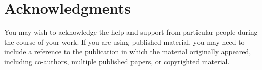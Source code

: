\chapter*{Acknowledgments}

You may wish to acknowledge the help and support from particular people during the course of your work. If you are using published material, you may need to include a reference to the publication in which the material originally appeared, including co-authors, multiple published papers, or copyrighted material.

